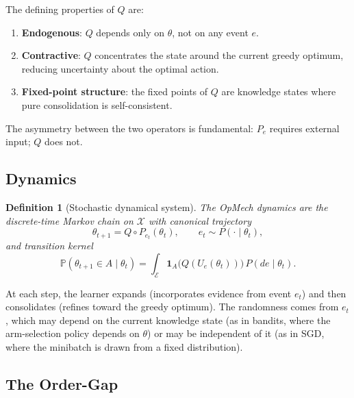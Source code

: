 \documentclass[12pt,a4paper]{article}
\newtheorem{definition}{Definition}[section]
\newcommand{\X}{\mathcal{X}}
\newcommand{\E}{\mathcal{E}}
\begin{document}
The defining properties of $Q$ are:
\begin{enumerate}
\item \textbf{Endogenous}: $Q$ depends only on $\theta$, not on any event $e$.
\item \textbf{Contractive}: $Q$ concentrates the state around the current
      greedy optimum, reducing uncertainty about the optimal action.
\item \textbf{Fixed-point structure}: the fixed points of $Q$ are knowledge
      states where pure consolidation is self-consistent.
\end{enumerate}

The asymmetry between the two operators is fundamental: $P_e$ requires
external input; $Q$ does not.

\subsection{Dynamics}
\label{sec:dynamics}

\begin{definition}[Stochastic dynamical system]
\label{def:dynamics}
The \emph{OpMech dynamics} are the discrete-time Markov chain on $\X$ with
canonical trajectory
\begin{equation}
\label{eq:dynamics}
\theta_{t+1} = Q \circ P_{e_t}(\theta_t), \qquad e_t \sim P(\cdot \mid \theta_t),
\end{equation}
and transition kernel
\begin{equation}
\label{eq:kernel}
\mathbb{P}(\theta_{t+1} \in A \mid \theta_t) =
\int_{\E} \mathbf{1}_A\bigl(Q(U_e(\theta_t))\bigr) \, P(de \mid \theta_t).
\end{equation}
\end{definition}

At each step, the learner expands (incorporates evidence from event $e_t$) and
then consolidates (refines toward the greedy optimum). The randomness
comes from $e_t$, which may depend on the current knowledge
state (as in bandits, where the arm-selection policy depends on $\theta$) or
may be independent of it (as in SGD, where the minibatch is drawn from a fixed
distribution).

\subsection{The Order-Gap}
\label{sec:ordergap}
\end{document}
